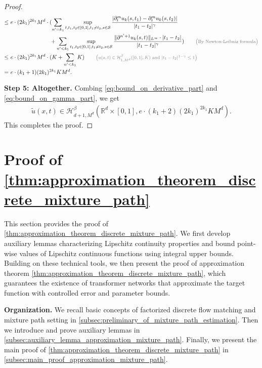 \documentclass[12pt]{article}
\numberwithin{equation}{section}
\let\tilde\widetilde
\newcommand{\wt}{\widetilde}
\renewcommand{\tilde}{\wt}
\def\R{\mathbb{R}}
\theoremstyle{theoremstyle}
\numberwithin{equation}{section}
\numberwithin{theorem}{section}
\numberwithin{proposition}{section}
\numberwithin{definition}{section}
\numberwithin{lemma}{section}
\numberwithin{assumption}{section}
\numberwithin{remark}{section}
\newcommand*{\annot}[1]{\tag*{\footnotesize{\textcolor{black!50}{\big(#1\big)}}}}
\begin{document}
\begin{proof}
\begin{align}
    \leq & ~
    e\cdot(2k_1)^{2k_1} M^d \cdot (\sum_{n'= k_1}\sup_{t,t_1,t_2\in[0,1],t_1\neq t_2,s\in \mathcal{S}}\frac{|\partial^m_t u_k(s,t_1)-\partial^m_t u_k(s,t_2)|}{|t_1-t_2|^\gamma} \notag\\
    & ~ \hspace{7em}
    +\sum_{n'< k_1}\sup_{t_1,t_2\in[0,1],t_1\neq t_2,s\in \mathcal{S}}\frac{\|\partial^{n'+1}u_k(s,t)\|_{L^\infty}\cdot|t_1-t_2|}{|t_1-t_2|^\gamma}) \annot{By Newton-Leibniz formula}\\
    \leq & ~
    e\cdot(2k_1)^{2k_1} M^d \cdot (K+\sum_{n'<k_1}K) \annot{$u(s,t)\in\mathcal{H}^\beta_{1,M^d}([0,1],K)$ and $|t_1-t_2|^{1-\gamma}\leq 1$}\\
    \label{eq:bound_on_gamma_part}
    = & ~
    e\cdot (k_1+1)(2k_1)^{2k_1}KM^d.
\end{align}

\textbf{Step 5: Altogether.}
Combing \eqref{eq:bound_on_derivative_part} and \eqref{eq:bound_on_gamma_part}, we get 
\begin{align*}
    \tilde{u}(x,t)\in\mathcal{H}^\beta_{d+1,M^d}(\R^d\times[0,1],e\cdot(k_1+2)(2k_1)^{2k_1} KM^d).
\end{align*}
This completes the proof.
\end{proof}




\clearpage

\section{\texorpdfstring{Proof of \cref{thm:approximation_theorem_discrete_mixture_path}}{Proof of Theorem \ref{thm:approximation_theorem_discrete_mixture_path}}}
\label{sec:proof_dfm_approx_mp}

This section provides the proof of \cref{thm:approximation_theorem_discrete_mixture_path}.
We first develop auxiliary lemmas characterizing Lipschitz continuity properties and bound point-wise values of Lipschitz continuous functions using integral upper bounds. 
Building on these technical tools, we then present the proof of approximation theorem \cref{thm:approximation_theorem_discrete_mixture_path}, which guarantees the existence of transformer networks that approximate the target function with controlled error and parameter bounds.

\textbf{Organization.}
We recall basic concepts of factorized discrete flow matching and mixture path setting in \cref{subsec:preliminary_of_mixture_path_estimation}.
Then we introduce and prove auxiliary lemmas in \cref{subsec:auxiliary_lemma_approximation_mixture_path}. 
Finally, we present the main proof of \cref{thm:approximation_theorem_discrete_mixture_path} in \cref{subsec:main_proof_approximation_mixture_path}.
\end{document}
